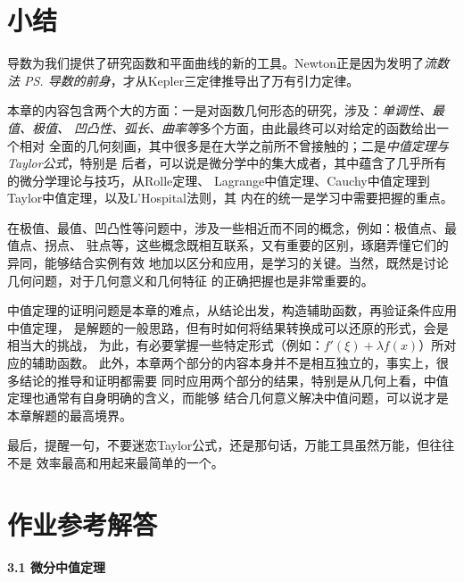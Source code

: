 \section{小结}

导数为我们提供了研究函数和平面曲线的新的工具。Newton正是因为发明了{\it 流数法
\ps{导数的前身}}，才从Kepler三定律推导出了万有引力定律。

本章的内容包含两个大的方面：一是对函数几何形态的研究，涉及：{\it 单调性、最值、极值、
凹凸性、弧长、曲率等}多个方面，由此最终可以对给定的函数给出一个相对
全面的几何刻画，其中很多是在大学之前所不曾接触的；二是{\it 中值定理与Taylor公式}，特别是
后者，可以说是微分学中的集大成者，其中蕴含了几乎所有的微分学理论与技巧，从Rolle定理、
Lagrange中值定理、Cauchy中值定理到Taylor中值定理，以及L'Hospital法则，其
内在的统一是学习中需要把握的重点。

在极值、最值、凹凸性等问题中，涉及一些相近而不同的概念，例如：极值点、最值点、拐点、
驻点等，这些概念既相互联系，又有重要的区别，琢磨弄懂它们的异同，能够结合实例有效
地加以区分和应用，是学习的关键。当然，既然是讨论几何问题，对于几何意义和几何特征
的正确把握也是非常重要的。

中值定理的证明问题是本章的难点，从结论出发，构造辅助函数，再验证条件应用中值定理，
是解题的一般思路，但有时如何将结果转换成可以还原的形式，会是相当大的挑战，
为此，有必要掌握一些特定形式（例如：$f'(\xi)+\lambda f(x)$）所对应的辅助函数。
此外，本章两个部分的内容本身并不是相互独立的，事实上，很多结论的推导和证明都需要
同时应用两个部分的结果，特别是从几何上看，中值定理也通常有自身明确的含义，而能够
结合几何意义解决中值问题，可以说才是本章解题的最高境界。

最后，提醒一句，不要迷恋Taylor公式，还是那句话，万能工具虽然万能，但往往不是
效率最高和用起来最简单的一个。

\visibletrue

\ifvisible

\newpage

\section*{作业参考解答}

\begin{center}
	\bf 3.1 微分中值定理
\end{center}

\bigskip

